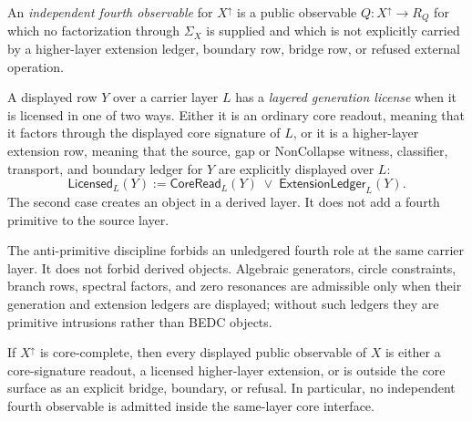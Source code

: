 \begin{definition}
\label{def:unified-reality-independent-fourth-observable}
An \emph{independent fourth observable} for $X^{\uparrow}$ is a public
observable $Q:X^{\uparrow}\to R_Q$ for which no factorization through
$\Sigma_X$ is supplied and which is not explicitly carried by a
higher-layer extension ledger, boundary row, bridge row, or refused
external operation.
\end{definition}

\begin{definition}
\label{def:unified-reality-layered-generation-license}
A displayed row $Y$ over a carrier layer $L$ has a \emph{layered
generation license} when it is licensed in one of two ways.  Either it
is an ordinary core readout, meaning that it factors through the
displayed core signature of $L$, or it is a higher-layer extension row,
meaning that the source, gap or NonCollapse witness, classifier,
transport, and boundary ledger for $Y$ are explicitly displayed over
$L$:
$$
\mathsf{Licensed}_L(Y)
:=
\mathsf{CoreRead}_L(Y)
\;\vee\;
\mathsf{ExtensionLedger}_L(Y).
$$
The second case creates an object in a derived layer.  It does not add a
fourth primitive to the source layer.
\end{definition}

\begin{principle}
\label{prin:unified-reality-no-same-layer-fourth-primitive}
The anti-primitive discipline forbids an unledgered fourth role at the
same carrier layer.  It does not forbid derived objects.  Algebraic
generators, circle constraints, branch rows, spectral factors, and zero
resonances are admissible only when their generation and extension
ledgers are displayed; without such ledgers they are primitive
intrusions rather than BEDC objects.
\end{principle}

\begin{theorem}
\label{thm:unified-reality-core-completeness-excludes-fourth-observables}
If $X^{\uparrow}$ is core-complete, then every displayed public
observable of $X$ is either a core-signature readout, a licensed
higher-layer extension, or is outside the core surface as an explicit
bridge, boundary, or refusal.  In particular, no independent fourth
observable is admitted inside the same-layer core interface.
\end{theorem}

